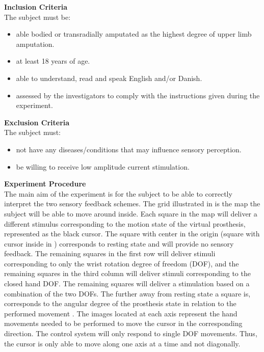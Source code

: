 \textbf{Inclusion Criteria} \\
The subject must be:
\begin{itemize}
	\item able bodied or transradially amputated as the highest degree of upper limb amputation.
	\item at least 18 years of age.
	\item able to understand, read and speak English and/or Danish.
	\item assessed by the investigators to comply with the instructions given during the experiment.
\end{itemize}

\textbf{Exclusion Criteria} \\
The subject must:
\begin{itemize}
	\item not have any diseases/conditions that may influence sensory perception.
	\item be willing to receive low amplitude current stimulation. 
\end{itemize}

\textbf{{\Large Experiment Procedure}} \\
\newline
The main aim of the experiment is for the subject to be able to correctly interpret the two sensory feedback schemes. The grid illustrated in  is the map the subject will be able to move around inside. Each square in the map will deliver a different stimulus corresponding to the motion state of the virtual prosthesis, represented as the black cursor. The square with center in the origin (square with cursor inside in ) corresponds to resting state and will provide no sensory feedback. The remaining squares in the first row will deliver stimuli corresponding to only the wrist rotation degree of freedom (DOF), and the remaining squares in the third column will deliver stimuli corresponding to the closed hand DOF. The remaining squares will deliver a stimulation based on a combination of the two DOFs. The further away from resting state a square is, corresponds to the angular degree of the prosthesis state in relation to the performed movement .
The images located at each axis represent the hand movements needed to be performed to move the cursor in the corresponding direction. The control system will only respond to single DOF movements. Thus, the cursor is only able to move along one axis at a time and not diagonally.

